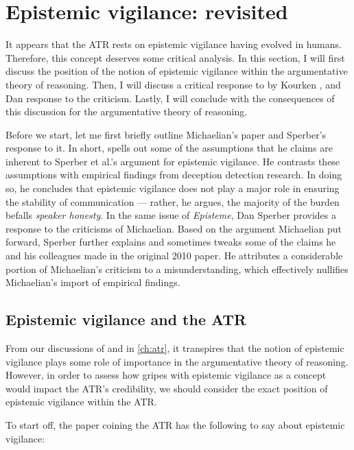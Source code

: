 \section{Epistemic vigilance: revisited}
\label{sec:EV-scrutiny}

It appears that the ATR rests on epistemic vigilance having evolved in humans. Therefore, this concept deserves some critical analysis.
In this section, I will first discuss the position of the notion of epistemic vigilance within the argumentative theory of reasoning. Then, I will discuss a critical response to \citet{Sperber10} by Kourken \citet{Michaelian13}, and Dan  response to the criticism.
Lastly, I will conclude with the consequences of this discussion for the argumentative theory of reasoning.

Before we start, let me first briefly outline Michaelian's paper and Sperber's response to it. In short, \citeauthor{Michaelian13} spells out some of the assumptions that he claims are inherent to Sperber et al.'s argument for epistemic vigilance. He contrasts these assumptions with empirical findings from deception detection research. In doing so, he concludes that epistemic vigilance does not play a major role in ensuring the stability of communication --- rather, he argues, the majority of the burden befalls \emph{speaker honesty}. In the same \citeyear{Sperber13} issue of \emph{Episteme}, Dan Sperber provides a response to the criticisms of Michaelian. Based on the argument Michaelian put forward, Sperber further explains and sometimes tweaks some of the claims he and his colleagues made in the original 2010 paper. He attributes a considerable portion of Michaelian's criticism to a misunderstanding, which effectively nullifies Michaelian's import of empirical findings.

\subsection{Epistemic vigilance and the ATR}
\label{sec:epi-vigil-atr}

From our discussions of \citet{Sperber10} and \citet{MS11} in \cref{ch:atr}, it transpires that the notion of epistemic vigilance plays some role of importance in the argumentative theory of reasoning. However, in order to assess how gripes with epistemic vigilance as a concept would impact the ATR's credibility, we should consider the exact position of epistemic vigilance within the ATR.

To start off, the paper coining the ATR has the following to say about epistemic vigilance:

